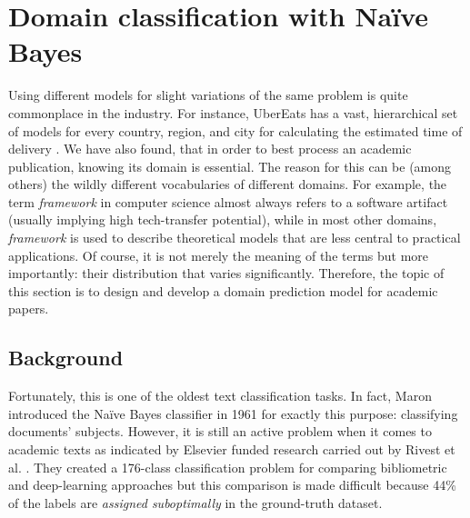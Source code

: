 \section{Domain classification with Naïve Bayes} \label{section:simple-case}

Using different models for slight variations of the same problem is quite commonplace in the industry. For instance, UberEats has a vast, hierarchical set of models for every country, region, and city for calculating the estimated time of delivery \cite{li2017scaling}. We have also found, that in order to best process an academic publication, knowing its domain is essential. The reason for this can be (among others) the wildly different vocabularies of different domains. For example, the term \textit{framework} in computer science almost always refers to a software artifact (usually implying high tech-transfer potential), while in most other domains, \textit{framework} is used to describe theoretical models that are less central to practical applications. Of course, it is not merely the meaning of the terms but more importantly: their distribution that varies significantly. Therefore, the topic of this section is to design and develop a domain prediction model for academic papers.

\subsection{Background}

Fortunately, this is one of the oldest text classification tasks. In fact, Maron introduced the Naïve Bayes classifier in 1961 \cite{maron1961automatic} for exactly this purpose: classifying documents' subjects. However, it is still an active problem when it comes to academic texts as indicated by Elsevier funded research carried out by Rivest et al. \cite{rivest2021level}. They created a 176-class classification problem for comparing bibliometric and deep-learning approaches but this comparison is made difficult because 44\% of the labels are \textit{assigned suboptimally} in the ground-truth dataset.

